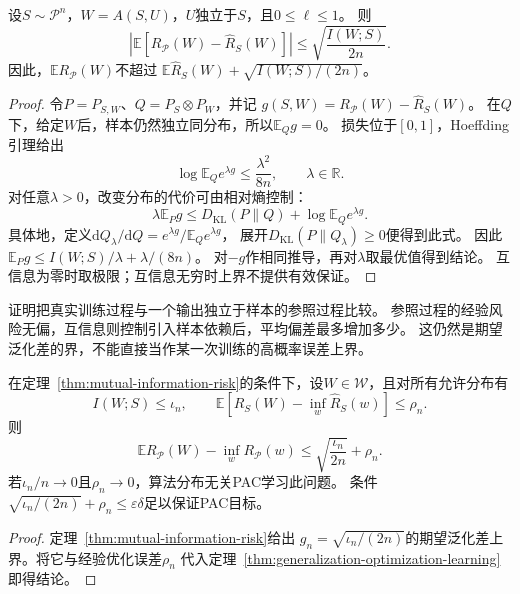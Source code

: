 \begin{theorem}[互信息与期望风险]
\label{thm:mutual-information-risk}
设$S\sim\mathcal P^n$，$W=A(S,U)$，$U$独立于$S$，且$0\leq\ell\leq1$。
则
\begin{equation}
 \left|\mathbb E[R_{\mathcal P}(W)-\hat R_S(W)]\right|
 \leq\sqrt{\frac{I(W;S)}{2n}}.
 \label{eq:mutual-information-generalization}
\end{equation}
因此，$\mathbb E R_{\mathcal P}(W)$不超过
$\mathbb E\hat R_S(W)+\sqrt{I(W;S)/(2n)}$。
\end{theorem}
\begin{proof}
令$P=P_{S,W}$、$Q=P_S\otimes P_W$，并记
$g(S,W)=R_{\mathcal P}(W)-\hat R_S(W)$。
在$Q$下，给定$W$后，样本仍然独立同分布，所以$\mathbb E_Qg=0$。
损失位于$[0,1]$，Hoeffding引理给出
\[
 \log\mathbb E_Q e^{\lambda g}\leq\frac{\lambda^2}{8n},
 \qquad \lambda\in\mathbb R.
\]
对任意$\lambda>0$，改变分布的代价可由相对熵控制：
\begin{equation}
 \lambda\mathbb E_Pg
 \leq D_{\mathrm{KL}}(P\|Q)+\log\mathbb E_Q e^{\lambda g}.
 \label{eq:information-change-measure}
\end{equation}
具体地，定义$\mathrm dQ_\lambda/\mathrm dQ=e^{\lambda g}/\mathbb E_Qe^{\lambda g}$，
展开$D_{\mathrm{KL}}(P\|Q_\lambda)\geq0$便得到此式。
因此$\mathbb E_Pg\leq I(W;S)/\lambda+\lambda/(8n)$。
对$-g$作相同推导，再对$\lambda$取最优值得到结论。
互信息为零时取极限；互信息无穷时上界不提供有效保证。
\end{proof}

证明把真实训练过程与一个输出独立于样本的参照过程比较。
参照过程的经验风险无偏，互信息则控制引入样本依赖后，平均偏差最多增加多少。
这仍然是期望泛化差的界，不能直接当作某一次训练的高概率误差上界。

\begin{theorem}[互信息稳定性与可学习性]
\label{thm:mutual-information-learning}
在定理~\ref{thm:mutual-information-risk}的条件下，设$W\in\mathcal W$，且对所有允许分布有
\[
 I(W;S)\leq\iota_n,\qquad
 \mathbb E[\hat R_S(W)-\inf_w\hat R_S(w)]\leq\rho_n.
\]
则
\[
 \mathbb E R_{\mathcal P}(W)-\inf_wR_{\mathcal P}(w)
 \leq\sqrt{\frac{\iota_n}{2n}}+\rho_n.
\]
若$\iota_n/n\to0$且$\rho_n\to0$，算法分布无关PAC学习此问题。
条件$\sqrt{\iota_n/(2n)}+\rho_n\leq\varepsilon\delta$足以保证PAC目标。
\end{theorem}
\begin{proof}
定理~\ref{thm:mutual-information-risk}给出
$g_n=\sqrt{\iota_n/(2n)}$的期望泛化差上界。将它与经验优化误差$\rho_n$
代入定理~\ref{thm:generalization-optimization-learning}即得结论。
\end{proof}

